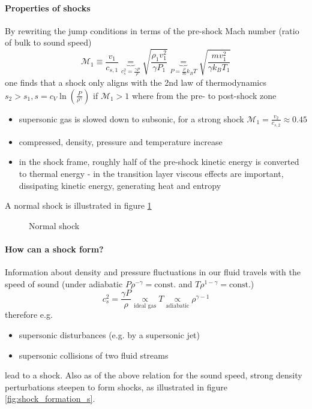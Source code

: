 \paragraph*{Properties of shocks} By rewriting the jump conditions in terms of the pre-shock Mach number (ratio of bulk to sound speed)
\begin{equation}
    \mathcal{M}_1 \equiv \frac{v_1}{c_{s,1}} \underbrace{=}_{c_s^2 = \frac{\gamma P}{\rho}} \sqrt{\frac{\rho_1 v_1^2}{\gamma P_1}} \underbrace{=}_{P=\frac{\rho}{m}k_B T} \sqrt{\frac{mv_1^2}{\gamma k_B T_1}}
\end{equation}
one finds that a shock only aligns with the 2nd law of thermodynamics
$s_2 > s_1, s = c_V \ln{\left( \frac{P}{\rho^{\gamma}} \right)}$ if
$\mathcal{M}_1 > 1$ where from the pre- to post-shock zone
\begin{itemize}
    \item supersonic gas is slowed down to subsonic, for a strong shock $\mathcal{M}_1 = \frac{v_2}{c_{s,2}} \approx 0.45$
    \item compressed, density, pressure and temperature increase
    \item in the shock frame, roughly half of the pre-shock kinetic energy is converted to thermal energy - in the transition layer viscous effects are important, dissipating kinetic energy, generating heat and entropy
\end{itemize}
A normal shock is illustrated in figure \ref{fig:normal_shock_s}

\begin{figure}[!htb]
    \centering
    
    \caption{Normal shock}
    \label{fig:normal_shock_s}
\end{figure}

\paragraph*{How can a shock form?} Information about density and pressure fluctuations
in our fluid travels with the speed of sound (under adiabatic $P\rho^{-\gamma} = \text{const.}$ and $T\rho^{1-\gamma} = \text{const.}$)
\begin{equation}
    c_s^2 = \frac{\gamma P}{\rho} \underset{\text{ideal gas}}{\propto} T \underset{\text{adiabatic}}{\propto} \rho^{\gamma - 1}
\end{equation}
therefore e.g.
\begin{itemize}
    \item supersonic disturbances (e.g. by a supersonic jet)
    \item supersonic collisions of two fluid streams
\end{itemize}
lead to a shock. Also as of the above relation for the sound speed,
strong density perturbations steepen to form shocks, as illustrated
in figure \ref{fig:shock_formation_s}.

